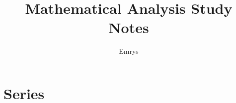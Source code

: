 \documentclass[12pt]{article}
\title{Mathematical Analysis Study Notes}
\author{Emrys}
\date{}
\theoremstyle{oneline}
\theoremstyle{twoline}
\begin{document}
 
\maketitle
\tableofcontents
\newpage

\section{Series}
\end{document}
